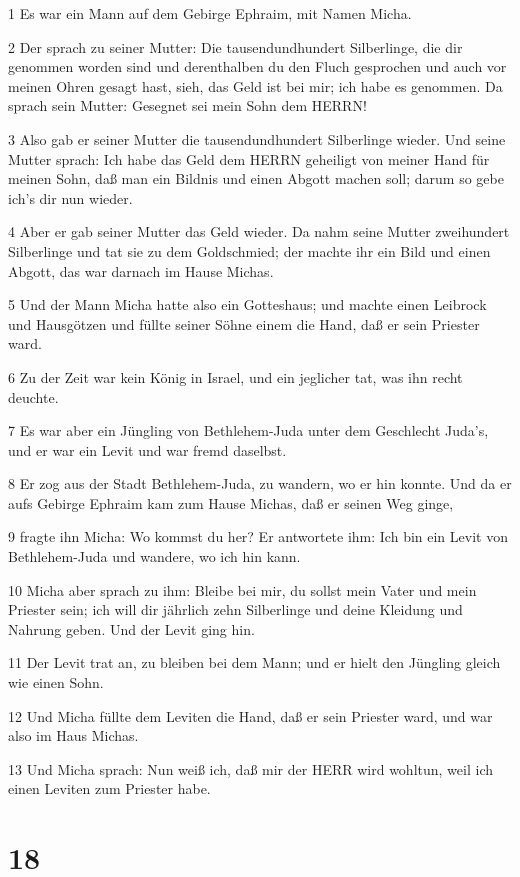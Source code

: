 \par 1 Es war ein Mann auf dem Gebirge Ephraim, mit Namen Micha.
\par 2 Der sprach zu seiner Mutter: Die tausendundhundert Silberlinge, die dir genommen worden sind und derenthalben du den Fluch gesprochen und auch vor meinen Ohren gesagt hast, sieh, das Geld ist bei mir; ich habe es genommen. Da sprach sein Mutter: Gesegnet sei mein Sohn dem HERRN!
\par 3 Also gab er seiner Mutter die tausendundhundert Silberlinge wieder. Und seine Mutter sprach: Ich habe das Geld dem HERRN geheiligt von meiner Hand für meinen Sohn, daß man ein Bildnis und einen Abgott machen soll; darum so gebe ich's dir nun wieder.
\par 4 Aber er gab seiner Mutter das Geld wieder. Da nahm seine Mutter zweihundert Silberlinge und tat sie zu dem Goldschmied; der machte ihr ein Bild und einen Abgott, das war darnach im Hause Michas.
\par 5 Und der Mann Micha hatte also ein Gotteshaus; und machte einen Leibrock und Hausgötzen und füllte seiner Söhne einem die Hand, daß er sein Priester ward.
\par 6 Zu der Zeit war kein König in Israel, und ein jeglicher tat, was ihn recht deuchte.
\par 7 Es war aber ein Jüngling von Bethlehem-Juda unter dem Geschlecht Juda's, und er war ein Levit und war fremd daselbst.
\par 8 Er zog aus der Stadt Bethlehem-Juda, zu wandern, wo er hin konnte. Und da er aufs Gebirge Ephraim kam zum Hause Michas, daß er seinen Weg ginge,
\par 9 fragte ihn Micha: Wo kommst du her? Er antwortete ihm: Ich bin ein Levit von Bethlehem-Juda und wandere, wo ich hin kann.
\par 10 Micha aber sprach zu ihm: Bleibe bei mir, du sollst mein Vater und mein Priester sein; ich will dir jährlich zehn Silberlinge und deine Kleidung und Nahrung geben. Und der Levit ging hin.
\par 11 Der Levit trat an, zu bleiben bei dem Mann; und er hielt den Jüngling gleich wie einen Sohn.
\par 12 Und Micha füllte dem Leviten die Hand, daß er sein Priester ward, und war also im Haus Michas.
\par 13 Und Micha sprach: Nun weiß ich, daß mir der HERR wird wohltun, weil ich einen Leviten zum Priester habe.

\chapter{18}

